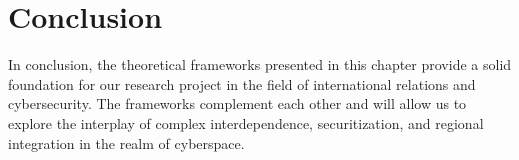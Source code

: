 \section{Conclusion}

In conclusion, the theoretical frameworks presented in this chapter provide a solid foundation for our research project in the field of international relations and cybersecurity. The frameworks complement each other and will allow us to explore the interplay of complex interdependence, securitization, and regional integration in the realm of cyberspace.